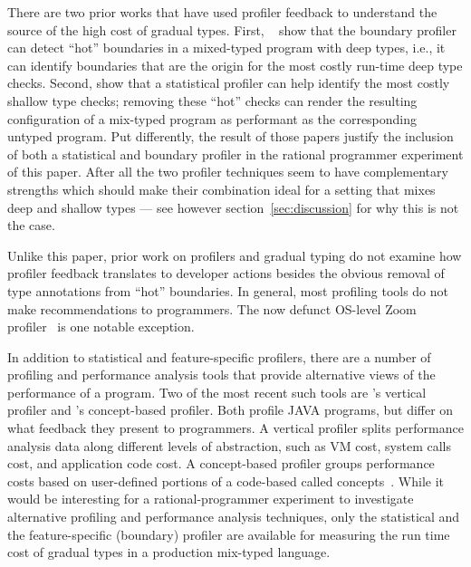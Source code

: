 There are two prior works that have used profiler feedback to understand
the source of the high cost of gradual types.  First,
~\citet{astavf-feature-prf} show that the boundary profiler can detect
``hot'' boundaries in a mixed-typed program with deep types, i.e., it can
identify boundaries that are the origin for the most costly run-time deep
type checks. Second, \cite{grmhn-vmil-2019} show that a statistical
profiler can help identify the most costly shallow type checks; removing
these ``hot'' checks can render the resulting configuration of a mix-typed
program as performant as the corresponding untyped program.  Put
differently, the result of those papers justify the inclusion of both a
statistical and boundary profiler in the rational programmer experiment of
this paper.  After all the two profiler techniques seem to have
complementary strengths which should make their combination ideal for a
setting that mixes deep and shallow types --- see however
section~\ref{sec:discussion} for why this is not the case. 

Unlike this paper, prior work on profilers and gradual typing do not
examine how profiler feedback translates to developer actions
besides the obvious removal of type annotations from ``hot'' boundaries. 
In general, most profiling tools do not make recommendations to
programmers. The now defunct OS-level Zoom profiler~\cite{zoom} is one
notable exception.  

In addition to statistical and feature-specific profilers, there are a
number of profiling and performance analysis tools that provide
alternative views of the performance of a program. Two of the most recent
such tools are \citet{vertical-profiler}'s vertical profiler and
\citet{java-profile-concepts}'s concept-based profiler. Both profile JAVA
programs, but differ on what feedback they present to programmers. A
vertical profiler splits performance analysis data   along different
levels of abstraction, such as VM cost, system calls cost, and application
code cost. A concept-based profiler groups performance costs based on
user-defined portions of a code-based called concepts~\cite{concepts}.
While it would be interesting for a rational-programmer experiment to
investigate alternative profiling and performance analysis
techniques, only the statistical and the feature-specific (boundary)
profiler are available for measuring the run time cost of gradual
types in a production mix-typed language.







